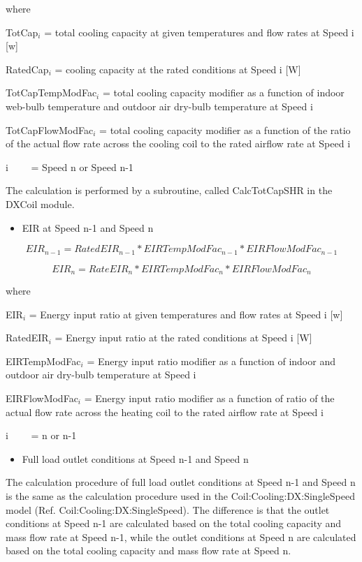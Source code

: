 where

TotCap\(_{i}\) = total cooling capacity at given temperatures and flow rates at Speed i {[}w{]}

RatedCap\(_{i}\) = cooling capacity at the rated conditions at Speed i {[}W{]}

TotCapTempModFac\(_{i}\) = total cooling capacity modifier as a function of indoor web-bulb temperature and outdoor air dry-bulb temperature at Speed i

TotCapFlowModFac\(_{i}\) = total cooling capacity modifier as a function of the ratio of the actual flow rate across the cooling coil to the rated airflow rate at Speed i

i~~~~ = Speed n or Speed n-1

The calculation is performed by a subroutine, called CalcTotCapSHR in the DXCoil module.

\begin{itemize}
  \item EIR at Speed n-1 and Speed n
\end{itemize}

\begin{equation}
EI{R_{n - 1}} = RatedEI{R_{n - 1}}*EIRTempModFa{c_{n - 1}}*EIRFlowModFa{c_{n - 1}}
\end{equation}

\begin{equation}
EI{R_n} = RateEI{R_n}*EIRTempModFa{c_n}*EIRFlowModFa{c_n}
\end{equation}

where

EIR\(_{i}\) = Energy input ratio at given temperatures and flow rates at Speed i {[}w{]}

RatedEIR\(_{i}\) = Energy input ratio at the rated conditions at Speed i {[}W{]}

EIRTempModFac\(_{i}\) = Energy input ratio modifier as a function of indoor and outdoor air dry-bulb temperature at Speed i

EIRFlowModFac\(_{i}\) = Energy input ratio modifier as a function of ratio of the actual flow rate across the heating coil to the rated airflow rate at Speed i

i~~~~ = n or n-1

\begin{itemize}
  \item Full load outlet conditions at Speed n-1 and Speed n
\end{itemize}

The calculation procedure of full load outlet conditions at Speed n-1 and Speed n is the same as the calculation procedure used in the Coil:Cooling:DX:SingleSpeed model (Ref. Coil:Cooling:DX:SingleSpeed). The difference is that the outlet conditions at Speed n-1 are calculated based on the total cooling capacity and mass flow rate at Speed n-1, while the outlet conditions at Speed n are calculated based on the total cooling capacity and mass flow rate at Speed n.

